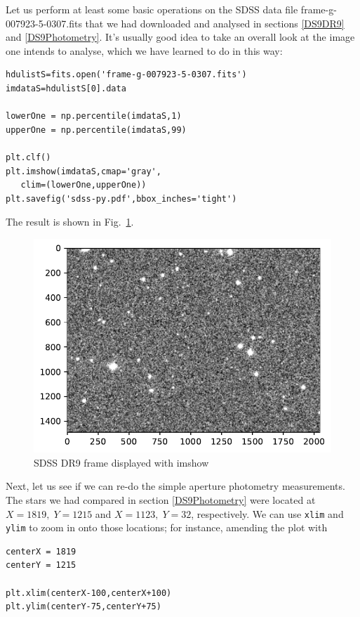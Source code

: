 \documentclass[twocolumn,apj]{openjournal}
\begin{document}
Let us perform at least some basic operations on the SDSS data file frame-g-007923-5-0307.fits that we had downloaded and analysed in sections \ref{DS9DR9} and \ref{DS9Photometry}. It's usually good idea to take an overall look at the image one intends to analyse, which we have learned to do in this way:
\begin{lstlisting}
hdulistS=fits.open('frame-g-007923-5-0307.fits')
imdataS=hdulistS[0].data

lowerOne = np.percentile(imdataS,1)
upperOne = np.percentile(imdataS,99)

plt.clf()
plt.imshow(imdataS,cmap='gray',
   clim=(lowerOne,upperOne))
plt.savefig('sdss-py.pdf',bbox_inches='tight')
\end{lstlisting}
The result is shown in Fig.~\ref{PySDSS}.
\begin{figure}[htbp]
\begin{center}
\includegraphics[width=\linewidth]{sdss-py.pdf}
\caption{SDSS DR9 frame displayed with imshow}
\label{PySDSS}
\end{center}
\end{figure}
Next, let us see if we can re-do the simple aperture photometry measurements. The stars we had compared in section \ref{DS9Photometry} were located at $X=1819,\; Y=1215$ and $X=1123,\;Y=32$, respectively. We can use \verb|xlim| and \verb|ylim| to zoom in onto those locations; for instance, amending the plot with
\begin{lstlisting}
centerX = 1819
centerY = 1215

plt.xlim(centerX-100,centerX+100)
plt.ylim(centerY-75,centerY+75)
\end{lstlisting}
\end{document}
